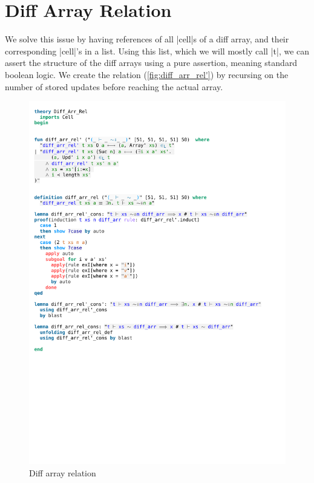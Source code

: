 \section{Diff Array Relation}

We solve this issue by having references of all |cell|s of a diff array, and their corresponding |cell|'s in a list. Using this list, which we will mostly call |t|, we can assert the structure of the diff arrays using a pure assertion, meaning standard boolean logic. We create the relation (\autoref{fig:diff_arr_rel'}) by recursing on the number of stored updates before reaching the actual array.

\begin{figure}[htpb]
    \includegraphics[trim={0 22,4cm 0 2,9cm}, clip, width=1.00\textwidth]{figures/Theory_Diff_Arr_Rel.pdf}
    \caption[Diff array relation]{Diff array relation\footnotemark}
    \label{fig:diff_arr_rel'}
\end{figure}

